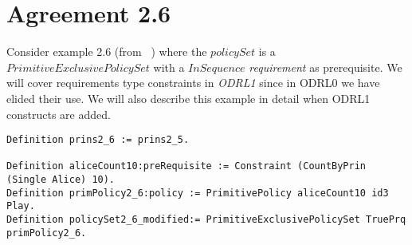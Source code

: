 \section{Agreement 2.6}

Consider example 2.6 (from ~\cite{pucella2006}) where the $policySet$ is a $PrimitiveExclusivePolicySet$ with a $InSequence$ \emph{requirement} as prerequisite. We will cover requirements type constraints in \emph{ODRL1} since in ODRL0 we have elided their use. We will also describe this example in detail when ODRL1 constructs are added.

 
\lstset{language=Coq}
\begin{lstlisting}[frame=single, caption={Example 2.6},label={lst:example26}]
Definition prins2_6 := prins2_5.

Definition aliceCount10:preRequisite := Constraint (CountByPrin (Single Alice) 10).
Definition primPolicy2_6:policy := PrimitivePolicy aliceCount10 id3 Play.
Definition policySet2_6_modified:= PrimitiveExclusivePolicySet TruePrq primPolicy2_6.
\end{lstlisting}






